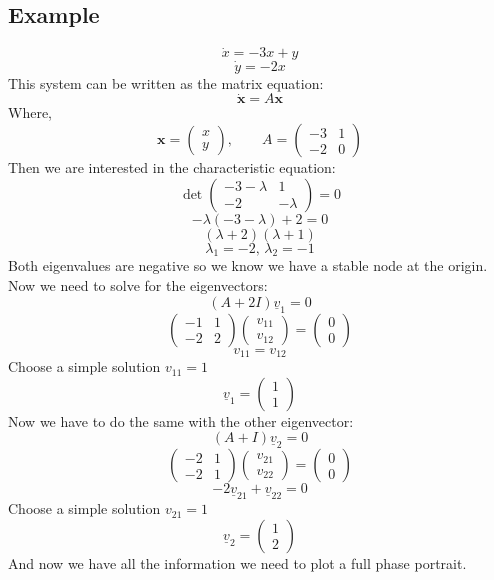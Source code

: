 \documentclass[12pt]{article}
\begin{document}
\subsection*{Example}
\[\dot{x}=-3x+y\]
\[\dot{y}=-2x\]
This system can be written as the matrix equation:
\[\dot{\textbf{x}}=A\textbf{x}\]
Where,
\[\textbf{x}=\begin{pmatrix}
    x \\
    y
\end{pmatrix},\qquad A=\begin{pmatrix}
    -3 & 1 \\
    -2 & 0
\end{pmatrix}\]
Then we are interested in the characteristic equation:
\[\det{\begin{pmatrix}
    -3-\lambda &1 \\
    -2 & -\lambda
\end{pmatrix}}=0\]
\[-\lambda(-3-\lambda)+2=0\]
\[(\lambda+2)(\lambda+1)\]
\[\lambda_1=-2,\,\lambda_2=-1\]
Both eigenvalues are negative so we know we have a stable node at the origin. Now we need to solve for the eigenvectors:
\[(A+2I)\underline{v}_1=0\]
\[\begin{pmatrix}
    -1 & 1 \\
    -2 & 2
\end{pmatrix}\begin{pmatrix}
    v_{11} \\
    v_{12}
\end{pmatrix}=\begin{pmatrix}
    0 \\ 0
\end{pmatrix}\]
\[v_{11}=v_{12}\]
Choose a simple solution \(v_{11}=1\)
\[\underline{v}_1=\begin{pmatrix}
    1 \\ 1
\end{pmatrix}\]
Now we have to do the same with the other eigenvector:
\[(A+I)\underline{v}_2=0\]
\[\begin{pmatrix}
    -2 & 1 \\
    -2 & 1
\end{pmatrix}\begin{pmatrix}
    v_{21} \\ v_{22}
\end{pmatrix}=\begin{pmatrix}
    0 \\ 0
\end{pmatrix}\]
\[-2\underline{v}_{21}+\underline{v}_{22}=0\]
Choose a simple solution \(v_{21}=1\)
\[\underline{v}_2=\begin{pmatrix}
    1 \\ 2
\end{pmatrix}\]
And now we have all the information we need to plot a full phase portrait.
\end{document}
